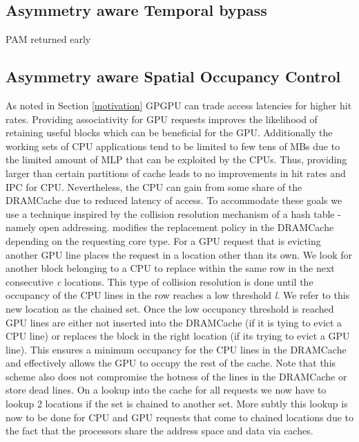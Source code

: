 \subsection{Asymmetry aware Temporal bypass}
PAM returned early
\subsection{Asymmetry aware Spatial Occupancy Control}
As noted in Section \ref{motivation} GPGPU can trade access latencies for higher hit rates. Providing associativity for GPU requests improves the likelihood of retaining useful blocks which can be beneficial for the GPU. Additionally the working sets of CPU applications tend to be limited to few tens of MBs due to the limited amount of MLP that can be exploited by the CPUs. Thus, providing larger than certain partitions of cache leads to no improvements in hit rates and IPC for CPU. Nevertheless, the CPU can gain from some share of the DRAMCache due to reduced latency of access.
To accommodate these goals we use a technique inspired by the collision resolution mechanism of a hash table - namely open addressing. \cachename modifies the replacement policy in the DRAMCache depending on the requesting core type. For a GPU request that is evicting another GPU line \cachename places the request in a location other than its own. We look for another block belonging to a CPU to replace within the same row in the next consecutive \textit{c} locations. This type of collision resolution is done until the occupancy of the CPU lines in the row reaches a low threshold \textit{l}. We refer to this new location as the chained set. Once the low occupancy threshold is reached GPU lines are either not inserted into the DRAMCache (if it is tying to evict a CPU line) or replaces the block in the right location (if its trying to evict a GPU line). This ensures a minimum occupancy for the CPU lines in the DRAMCache and effectively allows the GPU to occupy the rest of the cache. Note that this scheme also does not compromise the hotness of the lines in the DRAMCache or store dead lines.
On a lookup into the cache for all requests we now have to lookup 2 locations if the set is chained to another set. More subtly this lookup is now to be done for CPU and GPU requests that come to chained locations due to the fact that the processors share the address space and data via caches.